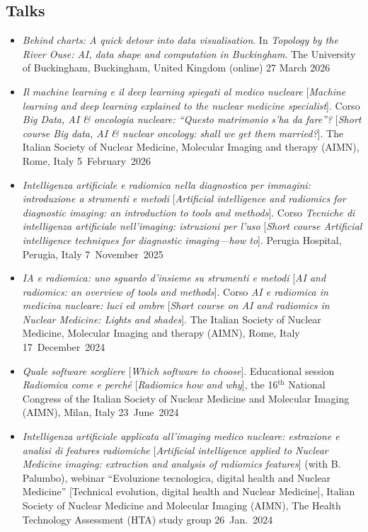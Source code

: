 \documentclass[11pt]{article}
\begin{document}
\subsection*{Talks}

\begin{itemize}

\item \emph{Behind charts: A quick detour into data visualisation}. In \emph{Topology by the River Ouse: AI, data shape and computation in Buckingham}. The University of Buckingham, Buckingham, United Kingdom (online) \hfill 27 March 2026

\item \emph{Il machine learning e il deep learning spiegati al medico nucleare} [\emph{Machine learning and deep learning explained to the nuclear medicine specialist}]. Corso \emph{Big Data, AI \& oncologia nucleare: ``Questo matrimonio s'ha da fare''? } [\emph{Short course Big data, AI \& nuclear oncology: shall we get them married?}]. The Italian Society of Nuclear Medicine, Molecular Imaging and therapy (AIMN), Rome, Italy \hfill 5~February~2026

\item \emph{Intelligenza artificiale e radiomica nella diagnostica per immagini: introduzione a strumenti e metodi} [\emph{Artificial intelligence and radiomics for diagnostic imaging: an introduction to tools and methods}]. Corso \emph{Tecniche di intelligenza artificiale nell'imaging: istruzioni per l'uso} [\emph{Short course Artificial intelligence techniques for diagnostic imaging—how to}]. Perugia Hospital, Perugia, Italy \mbox{} \hfill 7~November~2025

\item \emph{IA e radiomica: uno sguardo d'insieme su strumenti e metodi} [\emph{AI and radiomics: an overview of tools and methods}]. Corso \emph{AI e radiomica in medicina nucleare: luci ed ombre} [\emph{Short course on AI and radiomics in Nuclear Medicine: Lights and shades}]. The Italian Society of Nuclear Medicine, Molecular Imaging and therapy (AIMN), Rome, Italy \hfill 17~December~2024

\item \emph{Quale software scegliere} [\emph{Which software to choose}]. Educational session \emph{Radiomica come e perché} [\emph{Radiomics how and why}], the 16$^\text{th}$ National Congress of the Italian Society of Nuclear Medicine and Molecular Imaging (AIMN), Milan, Italy \hfill 23~June~2024

\item \emph{Intelligenza artificiale applicata all’imaging medico nucleare: estrazione e analisi di features radiomiche} [\emph{Artificial intelligence applied to Nuclear Medicine imaging: extraction and analysis of radiomics features}] (with B. Palumbo), webinar ``Evoluzione tecnologica, digital health and Nuclear Medicine'' [Technical evolution, digital health and Nuclear Medicine], Italian Society of Nuclear Medicine and Molecular Imaging (AIMN), The Health Technology Assessment (HTA) study group \hfill 26~Jan.~2024


\end{itemize}
\end{document}
